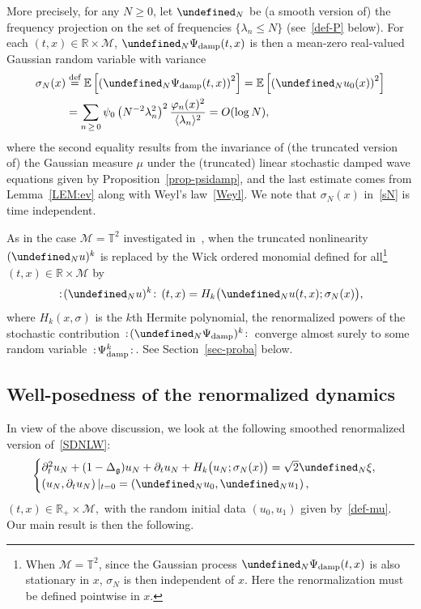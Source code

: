 \documentclass[AHL,Unicode,longabstracts,published]{cedram}
\newcommand{\damp}{\textup{damp}}
\newcommand{\R}{\mathbb{R}}
\newcommand{\T}{\mathbb{T}}
\newcommand{\E}{\mathbb{E}}
\newcommand{\deff}{\overset{\textup{def}}{=}}
\let\P= \undefined
\newcommand{\P}{\mathbf{P}}
\newcommand{\M}{\mathcal{M}}
\newcommand{\g}{\mathfrak{g}}
\newcommand{\Dlg}{\Delta_{\g}}
\newcommand{\s}{\sigma}
\newcommand{\dt}{\partial_t}
\newcommand{\jb}[1] {\langle #1 \rangle}
\begin{document}
More precisely, for any $N\geq 0$, let $\P_N$ be (a smooth version of) the frequency projection on the set of frequencies $\{\lambda_n\leq N\}$ (see~\eqref{def-P} below). For each $(t,x) \in \R\times \M$, $\P_N \Psi_{\damp}(t,x)$ is then a mean-zero real-valued Gaussian random variable with variance
\begin{equation}\label{sN}
\begin{split}
\s_N(x) &\deff \E \left[\left(\P_N \Psi_{\damp}(t,x)\right)^2\right] = \E\left[\left(\P_Nu_0(x)\right)^2\right]\\
&= \sum_{n\,\geq\,0}\psi_0\left(N^{-2}\lambda_n^2\right)^2\frac{\varphi_n(x)^2}{\jb{\lambda_n}^2} = O(\log N),
\end{split}
\end{equation}
where the second equality results from the invariance of (the truncated version of) the Gaussian measure $\mu$ under the (truncated) linear stochastic damped wave equations given by Proposition~\ref{prop-psidamp}, and the last estimate comes from Lemma~\ref{LEM:ev} along with Weyl's law~\eqref{Weyl}. We note that $\s_N(x)$ in~\eqref{sN} is time independent.

As in the case $\M=\T^2$ investigated in~\cite{OT1,OT2,GKO}, when the truncated nonlinearity $(\P_Nu)^k$ is replaced by the Wick ordered monomial defined for all\footnote{ When $\M = \T^2$, since the Gaussian process $\P_N\Psi_{\damp}(t,x)$ is also stationary in $x$, $\s_N$ is then independent of $x$. Here the renormalization must be defined pointwise in $x$.} $(t,x)\in\R\times\M$ by
\begin{equation}\label{Wick1}
\,:\!(\P_Nu)^{k}\!:\,(t,x)=H_{k}\big(\P_Nu(t,x);\s_N(x)\big),
\end{equation}
where $H_{k}(x,\s)$ is the $k$th Hermite polynomial, the renormalized powers of the stochastic contribution $\,:\!(\P_N\Psi_{\damp})^k\!:\,$ converge almost surely to some random variable $\,:\!\Psi_{\damp}^k\!:\,$. See Section~\ref{sec-proba} below.

\subsection{Well-posedness of the renormalized dynamics}

In view of the above discussion, we look at the following smoothed renormalized version of~\eqref{SDNLW}:
\begin{multline}\label{trunc-SDNLW}
\begin{cases}
\dt^2 u_N + (1- \Dlg) u_N + \dt u_N + H_k\big(u_N;\s_N(x)\big) = \sqrt{2}\P_N\xi, \\
\left(u_N,\dt u_N\right)|_{t=0}=\left(\P_Nu_0,\P_Nu_1\right),
\end{cases}
\end{multline}
$(t,x)\in \R_+\times\M,$ with the random initial data $(u_0,u_1)$ given by~\eqref{def-mu}. Our main result is then the following.
\end{document}
